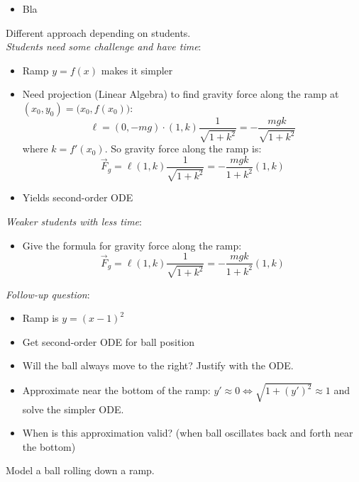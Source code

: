 \bookonlynewpage

\begin{lesson}

	\begin{itemize}
		\item Bla
	\end{itemize}
	

\end{lesson}


\begin{annotation}
	\begin{goals}
		Different approach depending on students. \\
		
		\emph{Students need some challenge and have time}:
		\begin{itemize}
			\item Ramp $y=f(x)$ makes it simpler
			\item Need projection (Linear Algebra) to find gravity force along the ramp at $(x_0,y_0) = \big(x_0,f(x_0)\big)$:
			$$			
			\ell = (0,-mg) \cdot (1, k)\frac{1}{\sqrt{1+k^2}} = -\frac{mgk}{\sqrt{1+k^2}}
			$$
			where $k = f'(x_0)$.
			So gravity force along the ramp is:
			$$
			\vec{F}_g = \ell (1, k)\frac{1}{\sqrt{1+k^2}} = -\frac{mgk}{1+k^2} (1,k)
			$$
			\item Yields second-order ODE 
		\end{itemize}
		\hfil
		
		\emph{Weaker students with less time}:
		\begin{itemize}
			\item Give the formula for gravity force along the ramp:
			$$
			\vec{F}_g = \ell (1, k)\frac{1}{\sqrt{1+k^2}} = -\frac{mgk}{1+k^2} (1,k)
			$$
		\end{itemize}
		
		\hfil
		
		\emph{Follow-up question}:
		\begin{itemize}
			\item Ramp is $y=(x-1)^2$
			\item Get second-order ODE for ball position
			\item Will the ball always move to the right? Justify with the ODE.
			\item Approximate near the bottom of the ramp: $y' \approx 0 \Leftrightarrow \sqrt{1+(y')^2} \approx 1$ and solve the simpler ODE.
			\item When is this approximation valid? (when ball oscillates back and forth near the bottom)
		\end{itemize}
	\end{goals}
\end{annotation}
\question
	Model a ball rolling down a ramp.

